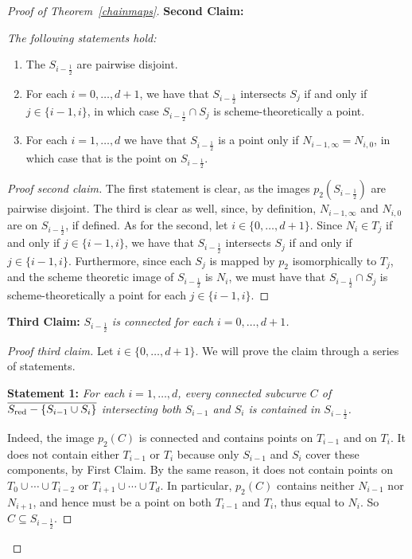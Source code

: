 \documentclass[a4paper,11pt]{amsart}
\theoremstyle{plain}
\theoremstyle{definition}
\theoremstyle{remark}
\def\red{\text{\rm red}}
\begin{document}
\begin{proof}[Proof of Theorem~\ref{chainmaps}]
\vskip0.2cm

{\bf Second Claim:} {\it The following statements hold:
\begin{enumerate}
\item The $S_{i-\frac{1}{2}}$ are pairwise disjoint.
\item For each $i=0,\dots,d+1$, we have that $S_{i-\frac{1}{2}}$ intersects $S_j$ if and only if $j\in\{i-1,i\}$, in which case $S_{i-\frac{1}{2}}\cap S_j$ is scheme-theoretically a point.
\item For each $i=1,\dots,d$ we have that $S_{i-\frac{1}{2}}$ is a point only if $N_{i-1,\infty}= N_{i,0}$, in which case that is the point on $S_{i-\frac{1}{2}}$.
\end{enumerate}
}

\begin{proof}[Proof second claim] The first statement is clear, as the images $p_2(S_{i-\frac{1}{2}})$ are pairwise disjoint. The third is clear as well, since, by definition, $N_{i-1,\infty}$ and $N_{i,0}$ are on $S_{i-\frac{1}{2}}$, if defined. As for the second, let  $i\in\{0,\dots,d+1\}$. Since $N_i\in T_j$ if and only if $j\in\{i-1,i\}$, we have that $S_{i-\frac{1}{2}}$ intersects $S_j$ if and only if $j\in\{i-1,i\}$. Furthermore, since each $S_j$ is mapped by $p_2$ isomorphically to $T_j$, and the scheme theoretic image of $S_{i-\frac{1}{2}}$ is $N_i$, we must have that $S_{i-\frac{1}{2}}\cap S_j$ is scheme-theoretically a point for each $j\in\{i-1,i\}$.
\end{proof}

{\bf Third Claim:} {\it $S_{i-\frac{1}{2}}$ is connected for each $i=0,\dots,d+1$.}

\begin{proof}[Proof third claim] Let $i\in\{0,\dots,d+1\}$. We will prove the claim through a series of statements.

\vskip0.1cm

{\bf Statement 1:} {\it For each $i=1,\dots,d$, every connected subcurve $C$ of $\overline{S_\red-\{S_{i-1}\cup S_i\}}$ intersecting both $S_{i-1}$ and $S_i$ is contained in $S_{i-\frac{1}{2}}$.}

Indeed, the image $p_2(C)$ is connected and contains points on $T_{i-1}$ and on $T_i$. It does not contain either $T_{i-1}$ or $T_i$ because only $S_{i-1}$ and $S_i$ cover these components, by First Claim. By the same reason, it does not contain points on $T_0\cup\cdots\cup T_{i-2}$ or $T_{i+1}\cup\cdots\cup T_d$. In particular, $p_2(C)$ contains neither $N_{i-1}$ nor $N_{i+1}$, and hence must be a point on both $T_{i-1}$ and $T_i$, thus equal to $N_i$. So $C\subseteq S_{i-\frac{1}{2}}$. 


\end{proof}
\end{proof}
\end{document}
